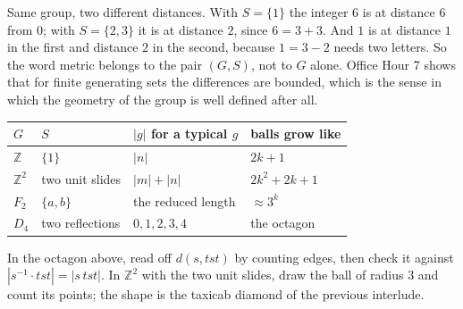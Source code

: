 \documentclass[10pt]{article}
\newcommand{\Z}{\mathbb{Z}}
\newcommand{\inv}{^{-1}}
\begin{document}
{\begin{minipage}[t]{744pt}
\begin{minipage}[t]{358pt}
{
}\par\vspace{2pt}
\begin{pitfall}
Same group, two different distances. With $S=\{1\}$ the integer $6$ is at distance $6$ from $0$; with $S=\{2,3\}$ it is at distance $2$, since $6=3+3$. And $1$ is at distance $1$ in the first and distance $2$ in the second, because $1=3-2$ needs two letters. So the word metric belongs to the pair $(G,S)$, not to $G$ alone. Office Hour 7 shows that for finite generating sets the differences are bounded, which is the sense in which the geometry of the group is well defined after all.
\end{pitfall}
\centering
\begin{tabular}{@{}llll@{}}
\toprule
$G$ & $S$ & $|g|$ for a typical $g$ & balls grow like\\
\midrule
$\Z$ & $\{1\}$ & $|n|$ & $2k+1$\\
$\Z^2$ & two unit slides & $|m|+|n|$ & $2k^2+2k+1$\\
$F_2$ & $\{a,b\}$ & the reduced length & $\approx 3^k$\\
$D_4$ & two reflections & $0,1,2,3,4$ & the octagon\\
\bottomrule
\end{tabular}\par\vspace{3pt}
\raggedright
\begin{tryit}
In the octagon above, read off $d(s,tst)$ by counting edges, then check it against $|s\inv\cdot tst|=|s\,tst|$. In $\Z^2$ with the two unit slides, draw the ball of radius $3$ and count its points; the shape is the taxicab diamond of the previous interlude.
\end{tryit}
\end{minipage}
\end{minipage}
}
\end{document}
